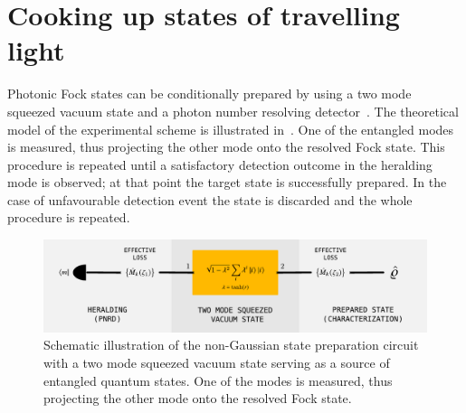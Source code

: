 \documentclass{article}
\begin{document}
%
%

\section{Cooking up states of travelling light}

Photonic Fock states can be conditionally prepared by using a two mode squeezed vacuum state and a photon number resolving detector~\cite{yukawa2013a,yoshikawa2018,tiedau2019,provaznik2020}. The theoretical model of the experimental scheme is illustrated in~. One of the entangled modes is measured, thus projecting the other mode onto the resolved Fock state. This procedure is repeated until a satisfactory detection outcome in the heralding mode is observed; at that point the target state is successfully prepared. In the case of unfavourable detection event the state is discarded and the whole procedure is repeated.

\begin{figure}[h]
  \begin{center}
    \includegraphics[width = 1.00 \columnwidth]{import/illustrate_scheme_alt.pdf}
  \end{center}
  \caption{
    Schematic illustration of the non-Gaussian state preparation circuit with a two mode squeezed vacuum state serving as a source of entangled quantum states. One of the modes is measured, thus projecting the other mode onto the resolved Fock state. 
  }
  \label{f-scheme}
\end{figure}
\end{document}
